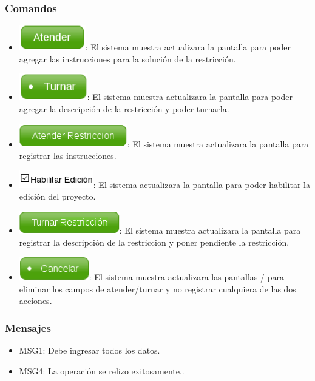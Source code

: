 \subsubsection{Comandos}
\begin{itemize}
 \item \includegraphics[width=.1\textwidth]{images/CUG1/Atender.png}: El sistema muestra actualizara la pantalla  para poder agregar las instrucciones para la solución de la restricción.
 \item \includegraphics[width=.1\textwidth]{images/CUG1/Turnar.png}: El sistema muestra actualizara la pantalla  para poder agregar la descripción de la restricción y poder turnarla.
 \item \includegraphics[width=.16\textwidth]{images/CUG1/AtenderRestriccion.png}: El sistema muestra actualizara la pantalla  para registrar las instrucciones.
 \item \includegraphics[width=.16\textwidth]{images/CUG1/HabilitarEdicion.png}: El sistema actualizara la pantalla  para poder habilitar la edición del proyecto.
 \item \includegraphics[width=.16\textwidth]{images/CUG1/TurnarRestriccion.png}: El sistema muestra actualizara la pantalla  para registrar la descripción de la restriccion y poner pendiente la restricción.
 \item \includegraphics[width=.1\textwidth]{images/CUG1/Cancelar.png}: El sistema muestra actualizara las pantallas  /  para eliminar los campos de atender/turnar y no registrar cualquiera de las dos acciones.
\end{itemize}

\subsubsection{Mensajes}
\begin{itemize}
  \item MSG1: Debe ingresar todos los datos.
  \item MSG4: La operación se relizo exitosamente..
\end{itemize}